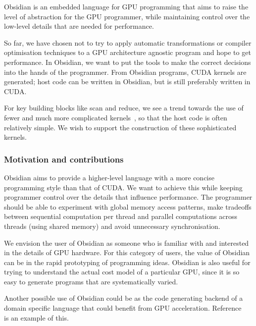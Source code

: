 Obsidian is an embedded language for GPU programming that aims to raise the 
level of abstraction for the GPU programmer, while maintaining control over 
the low-level details that are needed for performance. 

So far, we have chosen not to try to apply automatic transformations or compiler 
optimisation techniques to a GPU architecture agnostic program and hope 
to get performance. In Obsidian, we want to put the tools to make the 
correct decisions into the hands of the programmer. From Obsidian programs, 
CUDA kernels are generated; host code can be written in Obsidian, but is still 
preferably written in CUDA.

For key building blocks like scan and reduce, we see a trend towards
the use of fewer and much more complicated kernels~, so
that the host code is often relatively simple. We wish to support the construction of these sophisticated kernels.


\subsubsection{Motivation and contributions} 

Obsidian aims to provide a higher-level language with a more concise programming style than that of CUDA. We want to achieve 
this while keeping programmer control over the details that influence 
performance. The programmer should be able to experiment with global memory 
access patterns, make tradeoffs between sequential computation per thread 
and parallel computations across threads (using shared memory) and avoid 
unnecessary synchronisation. 

We envision the user of Obsidian as someone who is familiar with and 
interested in the details of GPU hardware. For this category of users,
the value of Obsidian can be in the rapid prototyping of programming ideas.
Obsidian is also useful for trying to understand the actual cost model
of a particular GPU, since it is so easy to generate programs that are
systematically varied.

Another possible use of Obsidian could be as the code generating backend of 
a domain specific language that could 
benefit from GPU acceleration. Reference ~ is an example of this.   
%

